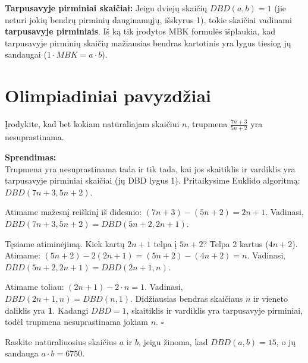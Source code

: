 \documentclass[11pt,a4paper]{scrartcl}
\newenvironment{solution}
    {\begin{list}{}{\setlength{\leftmargin}{10pt}\setlength{\rightmargin}{10pt}}\item[]}
    {\end{list}}
\begin{document}
\vspace{0.5cm}

\textbf{Tarpusavyje pirminiai skaičiai:} 
Jeigu dviejų skaičių $DBD(a, b) = 1$ (jie neturi jokių bendrų pirminių dauginamųjų, išskyrus 1), tokie skaičiai vadinami \textbf{tarpusavyje pirminiais}.
Iš ką tik įrodytos MBK formulės išplaukia, kad tarpusavyje pirminių skaičių mažiausias bendras kartotinis yra lygus tiesiog jų sandaugai ($1 \cdot MBK = a \cdot b$).


\section{Olimpiadiniai pavyzdžiai}

\begin{example}
Įrodykite, kad bet kokiam natūraliajam skaičiui $n$, trupmena $\frac{7n+3}{5n+2}$ yra nesuprastinama.
\end{example}

\begin{solution}
\textbf{Sprendimas:}\\
Trupmena yra nesuprastinama tada ir tik tada, kai jos skaitiklis ir vardiklis yra tarpusavyje pirminiai skaičiai (jų DBD lygus 1). Pritaikysime Euklido algoritmą:
$DBD(7n+3, 5n+2)$.

Atimame mažesnį reiškinį iš didesnio: $(7n+3) - (5n+2) = 2n+1$.
Vadinasi, $DBD(7n+3, 5n+2) = DBD(5n+2, 2n+1)$.

Tęsiame atiminėjimą. Kiek kartų $2n+1$ telpa į $5n+2$? Telpa 2 kartus ($4n+2$). Atimame:
$(5n+2) - 2(2n+1) = (5n+2) - (4n+2) = n$.
Vadinasi, $DBD(5n+2, 2n+1) = DBD(2n+1, n)$.

Atimame toliau: $(2n+1) - 2 \cdot n = 1$.
Vadinasi, $DBD(2n+1, n) = DBD(n, 1)$.
Didžiausias bendras skaičiaus $n$ ir vieneto daliklis yra \textbf{1}. 
Kadangi $DBD = 1$, skaitiklis ir vardiklis yra tarpusavyje pirminiai, todėl trupmena nesuprastinama jokiam $n$. \hfill $\square$
\end{solution}

\begin{example}
Raskite natūraliuosius skaičius $a$ ir $b$, jeigu žinoma, kad $DBD(a, b) = 15$, o jų sandauga $a \cdot b = 6750$.
\end{example}
\end{document}
